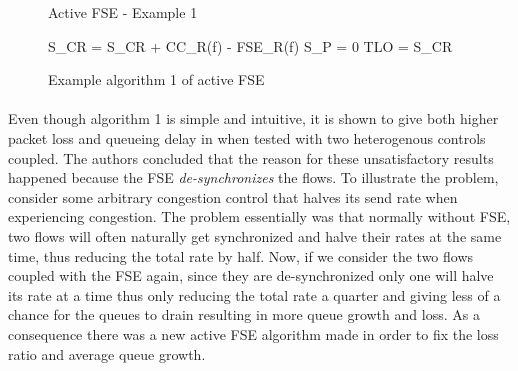 \begin{figure}
\begin{algorithm}[H]
    \SetAlgoLined
    \caption{Active FSE - Example 1}
    S\_CR = S\_CR + CC\_R(f) - FSE\_R(f)\;
    S\_P = 0\;
    TLO = S\_CR\;
\end{algorithm}
\caption{Example algorithm 1 of active FSE}
\label{active-fse-1}
\end{figure}

\paragraph{}
Even though algorithm 1 is simple and intuitive, it is shown to give both higher packet loss and queueing delay in \cite{10.1145/2740070.2630089} when tested with two heterogenous controls coupled. 
The authors concluded that the reason for these unsatisfactory results happened because the FSE \textit{de-synchronizes} the flows.
To illustrate the problem, consider some arbitrary congestion control that halves its send rate when experiencing congestion.
The problem essentially was that normally without FSE, two flows will often naturally get synchronized and halve their rates at the same time, thus reducing the total rate by half.
Now, if we consider the two flows coupled with the FSE again, since they are de-synchronized only one will halve its rate at a time thus only reducing the total rate a quarter and giving less of a chance for the queues to drain resulting in more queue growth and loss.
As a consequence there was a new active FSE algorithm made in order to fix the loss ratio and average queue growth.
